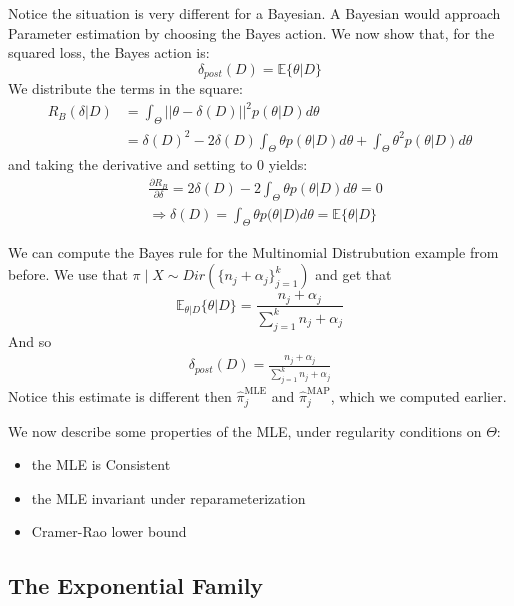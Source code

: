 \documentclass[]{article}
\theoremstyle{mattstyle}
\theoremstyle{definition}
\begin{document}
Notice the situation is very different for a Bayesian. A Bayesian would approach Parameter estimation by choosing the Bayes action. We now show that, for the squared loss, the Bayes action is:
$$\delta_{post}(D) = \mathbb{E}\{\theta|D\}$$
We distribute the terms in the square:
\begin{align*}
R_B(\delta|D) &= \int_{\Theta}^{}||\theta-\delta(D)||^2p(\theta|D)d\theta \\
&=\delta(D)^2 -2\delta(D)\int_{\Theta}^{}\theta p(\theta|D)d\theta+\int_{\Theta}^{}\theta^2 p(\theta|D)d\theta
\end{align*}
and taking the derivative and setting to 0 yields:
\begin{align*}
&\frac{\partial R_B}{\partial \delta} = 2\delta(D) -2\int_{\Theta}^{}\theta p(\theta|D)d\theta = 0 \\
&\Rightarrow \delta(D) = \int_{\Theta}^{}\theta p(\theta|D)d\theta = \mathbb{E}\{\theta|D\}
\end{align*}

We can compute the Bayes rule for the Multinomial Distrubution example from before. We use that $\pi \mid X \sim Dir\left(\{n_j + \alpha_j\}_{j=1}^k\right)$ and get that $$\mathbb{E}_{\theta|D}\{\theta|D\}=\frac{n_j + \alpha_j}{\sum_{j=1}^{k} n_j + \alpha_j}$$
And so
\begin{align*}
\boxed{\delta_{post}(D) =\frac{n_j + \alpha_j}{\sum_{j=1}^{k} n_j + \alpha_j} }
\end{align*}
Notice this estimate is different then $\hat{\pi}_{j}^{\text{MLE}}$ and $\hat{\pi}_{j}^{\text{MAP}}$, which we computed earlier.

We now describe some properties of the MLE, under regularity conditions on $\Theta$:
\begin{itemize}
	\item the MLE is Consistent
	\item the MLE invariant under reparameterization
	\item Cramer-Rao lower bound
\end{itemize}

\newpage

\subsection{The Exponential Family}\label{sec:expfam}
\end{document}

